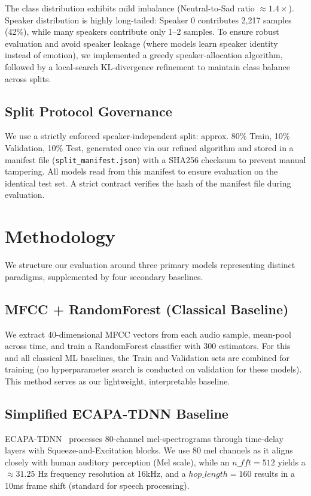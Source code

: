 \documentclass[12pt,a4paper]{report}
\begin{document}
The class distribution exhibits mild imbalance (Neutral-to-Sad ratio $\approx 1.4\times$). Speaker distribution is highly long-tailed: Speaker 0 contributes 2,217 samples (42\%), while many speakers contribute only 1--2 samples. To ensure robust evaluation and avoid speaker leakage (where models learn speaker identity instead of emotion), we implemented a greedy speaker-allocation algorithm, followed by a local-search KL-divergence refinement to maintain class balance across splits.

\section{Split Protocol Governance}
\label{sec:split_protocol}
We use a strictly enforced speaker-independent split: approx. 80\% Train, 10\% Validation, 10\% Test, generated once via our refined algorithm and stored in a manifest file (\texttt{split\_manifest.json}) with a SHA256 checksum to prevent manual tampering. All models read from this manifest to ensure evaluation on the identical test set. A strict contract verifies the hash of the manifest file during evaluation.

\chapter{Methodology}

We structure our evaluation around three primary models representing distinct paradigms, supplemented by four secondary baselines.

\section{MFCC + RandomForest (Classical Baseline)}
We extract 40-dimensional MFCC vectors from each audio sample, mean-pool across time, and train a RandomForest classifier with 300 estimators. For this and all classical ML baselines, the Train and Validation sets are combined for training (no hyperparameter search is conducted on validation for these models). This method serves as our lightweight, interpretable baseline.

\section{Simplified ECAPA-TDNN Baseline}
ECAPA-TDNN~\cite{ecapa} processes 80-channel mel-spectrograms through time-delay layers with Squeeze-and-Excitation blocks. We use 80 mel channels as it aligns closely with human auditory perception (Mel scale), while an $n\_fft=512$ yields a $\approx 31.25$ Hz frequency resolution at 16kHz, and a $hop\_length=160$ results in a 10ms frame shift (standard for speech processing).
\end{document}
